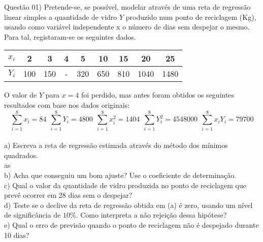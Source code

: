 
\noindent \textcolor{COLOR1}{Questão 01)}  Pretende-se, se possível, modelar através de uma reta de regressão linear simples a quantidade de vidro $Y$ produzido num ponto de reciclagem (Kg), usando como variável independente x o número de dias sem despejar o mesmo. Para tal, registaram-se os seguintes dados.
\\

\begin{table}[ht]
    \centering
    \begin{tabular}{c|c|c|c|c|c|c|c|c}
        \rowcolor{pagecolor!50!COLOR1}
        \hline
        $x_i$ & 2   & 3   & 4 & 5   & 10  & 15  & 20   & 25   \\ \hline\hline
        $Y_i$ & 100 & 150 & - & 320 & 650 & 810 & 1040 & 1480 \\\hline
    \end{tabular}
\end{table}


O valor de $Y$ para $x = 4$ foi perdido, mas antes foram obtidos os seguintes resultados com base nos dados originais:
\\

\[
    \sum_{i=1}^{8}x_i=84\ \ \sum_{i=1}^{8}Y_i=4800\ \ \sum_{i=1}^{8}x_i^2=1404\ \ \sum_{i=1}^{8}Y_i^2=4548000\ \ \sum_{i=1}^{8}x_iY_i=79700
\]
\\
a) Escreva a reta de regressão estimada através do método dos mínimos quadrados.\\
as
\\
b) Acha que conseguiu um bom ajuste? Use o coeficiente de determinação.\\
c) Qual o valor da quantidade de vidro produzida no ponto de reciclagem que prevê ocorrer em 28 dias sem o despejar?\\
d) Teste se o declive da reta de regressão obtida em (a) é zero, usando um nível de significância de $10\%$. Como interpreta a não rejeição dessa hipótese?\\
e) Qual o erro de previsão quando o ponto de reciclagem não é despejado durante 10 dias?\\